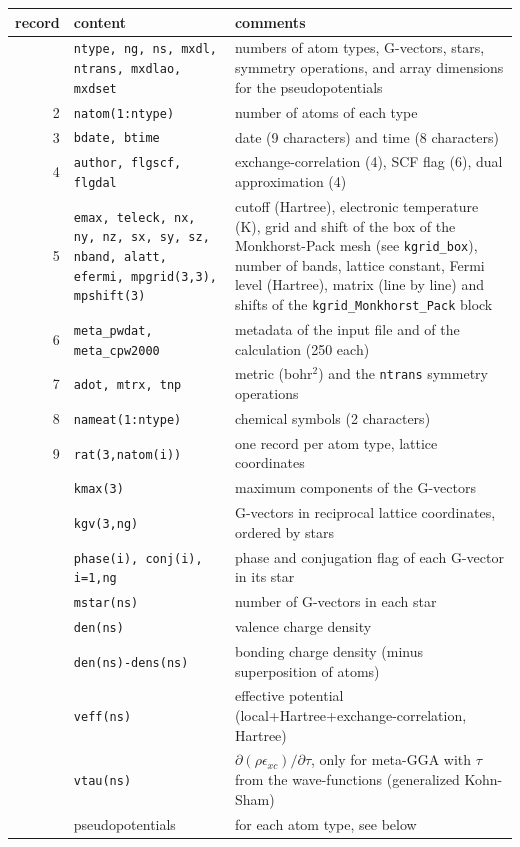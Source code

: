 \documentclass[11pt]{article}
\begin{document}
\begin{longtable}{rp{6.0cm}p{7.5cm}}
\hline
record & content & comments \\
\hline
\endhead
\hline
\endfoot
1  & \texttt{ntype, ng, ns, mxdl, ntrans, mxdlao, mxdset}
   & numbers of atom types, G-vectors, stars, symmetry operations,
     and array dimensions for the pseudopotentials \\
2  & \texttt{natom(1:ntype)} & number of atoms of each type \\
3  & \texttt{bdate, btime} & date (9 characters) and time (8 characters) \\
4  & \texttt{author, flgscf, flgdal} & exchange-correlation (4), SCF flag (6), dual approximation (4) \\
5  & \texttt{emax, teleck, nx, ny, nz, sx, sy, sz, nband, alatt, efermi, mpgrid(3,3), mpshift(3)}
   & cutoff (Hartree), electronic temperature (K),
     grid and shift of the box of the Monkhorst-Pack mesh (see \texttt{kgrid\_box}), number of bands,
     lattice constant, Fermi level (Hartree), matrix (line by line) and shifts of the
     \texttt{kgrid\_Monkhorst\_Pack} block \\
6  & \texttt{meta\_pwdat, meta\_cpw2000} & metadata of the input file and of the calculation (250 each) \\
7  & \texttt{adot, mtrx, tnp} & metric (bohr$^2$) and the \texttt{ntrans} symmetry operations \\
8  & \texttt{nameat(1:ntype)} & chemical symbols (2 characters) \\
9  & \texttt{rat(3,natom(i))} & one record per atom type, lattice coordinates \\
   & \texttt{kmax(3)} & maximum components of the G-vectors \\
   & \texttt{kgv(3,ng)} & G-vectors in reciprocal lattice coordinates, ordered by stars \\
   & \texttt{phase(i), conj(i), i=1,ng} & phase and conjugation flag of each G-vector in its star \\
   & \texttt{mstar(ns)} & number of G-vectors in each star \\
   & \texttt{den(ns)} & valence charge density \\
   & \texttt{den(ns)-dens(ns)} & bonding charge density (minus superposition of atoms) \\
   & \texttt{veff(ns)} & effective potential (local+Hartree+exchange-correlation, Hartree) \\
   & \texttt{vtau(ns)} & $\partial(\rho\epsilon_{xc})/\partial\tau$, only for meta-GGA with $\tau$ from the
     wave-functions (generalized Kohn-Sham) \\
   & pseudopotentials & for each atom type, see below \\
\end{longtable}
\end{document}
